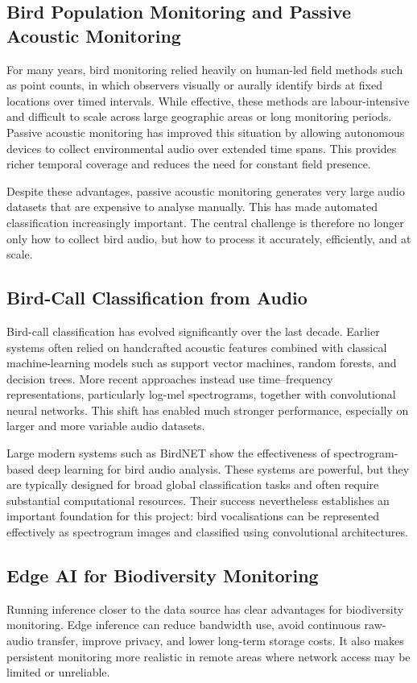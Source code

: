 \documentclass[conference]{IEEEtran}
\begin{document}
\subsection{Bird Population Monitoring and Passive Acoustic Monitoring}
For many years, bird monitoring relied heavily on human-led field methods such as point counts, in which observers visually or aurally identify birds at fixed locations over timed intervals. While effective, these methods are labour-intensive and difficult to scale across large geographic areas or long monitoring periods. Passive acoustic monitoring has improved this situation by allowing autonomous devices to collect environmental audio over extended time spans. This provides richer temporal coverage and reduces the need for constant field presence.

Despite these advantages, passive acoustic monitoring generates very large audio datasets that are expensive to analyse manually. This has made automated classification increasingly important. The central challenge is therefore no longer only how to collect bird audio, but how to process it accurately, efficiently, and at scale.

\subsection{Bird-Call Classification from Audio}
Bird-call classification has evolved significantly over the last decade. Earlier systems often relied on handcrafted acoustic features combined with classical machine-learning models such as support vector machines, random forests, and decision trees. More recent approaches instead use time--frequency representations, particularly log-mel spectrograms, together with convolutional neural networks. This shift has enabled much stronger performance, especially on larger and more variable audio datasets.

Large modern systems such as BirdNET \cite{kahl2021birdnet} show the effectiveness of spectrogram-based deep learning for bird audio analysis. These systems are powerful, but they are typically designed for broad global classification tasks and often require substantial computational resources. Their success nevertheless establishes an important foundation for this project: bird vocalisations can be represented effectively as spectrogram images and classified using convolutional architectures.

\subsection{Edge AI for Biodiversity Monitoring}
Running inference closer to the data source has clear advantages for biodiversity monitoring. Edge inference can reduce bandwidth use, avoid continuous raw-audio transfer, improve privacy, and lower long-term storage costs. It also makes persistent monitoring more realistic in remote areas where network access may be limited or unreliable.
\end{document}
